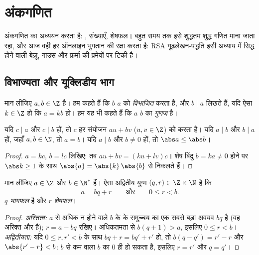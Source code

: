 \chapter{अंकगणित}\label{ch:g12:arith}

अंकगणित  का अध्ययन करता है: ,  संख्याएँ, शेषफल। बहुत
समय तक इसे शुद्धतम शुद्ध गणित माना जाता रहा, और आज वही हर ऑनलाइन भुगतान की
रक्षा करता है: RSA गूढ़लेखन-पद्धति इसी अध्याय में सिद्ध होने वाली बेज़ू, गाउस
और फ़र्मा की प्रमेयों पर टिकी है।

\section{विभाज्यता और यूक्लिडीय भाग}

\begin{definition}[विभाज्यता]\label{def:g12:arith:divides}
मान लीजिए $a, b \in \Z$ है। हम कहते हैं कि $b$ $a$ को \emph{विभाजित}
करता है, और $b \mid a$ लिखते हैं, यदि ऐसा $k \in \Z$ हो कि $a = kb$ हो। हम यह भी कहते हैं कि $a$
$b$ का \emph{गुणज} है।
\end{definition}

\begin{proposition}\label{prop:g12:arith:divprops}
यदि $c \mid a$ और $c \mid b$ हों, तो $c$ हर  संयोजन $au + bv$ ($u, v \in \Z$) को  करता
है। यदि $a \mid b$ और $b \mid a$ हों, जहाँ $a,b \in \N$, तो $a = b$। यदि $a \mid b$ और $b \neq 0$ हों, तो $\abs a \leq \abs b$।
\end{proposition}

\begin{proof}
$a = kc$, $b = lc$ लिखिए: तब $au + bv = (ku + lv)c$। शेष बिंदु $b = ka \neq 0$ होने पर $\abs k \geq 1$ के साथ $\abs{a} = \abs{k}\,\abs{b}$ से निकलते
हैं।
\end{proof}

\begin{theorem}[यूक्लिडीय भाग]\label{thm:g12:arith:euclid}
मान लीजिए $a \in \Z$ और $b \in \N^*$ हैं। ऐसा अद्वितीय युग्म $(q, r) \in \Z \times \N$ है कि
\[
a = bq + r \qquad\text{और}\qquad 0 \leq r < b .
\]
$q$ \emph{भागफल} है और $r$ \emph{शेषफल}।
\end{theorem}

\begin{proof}
\emph{अस्तित्व:} $a$ से अधिक न होने वाले $b$ के  के समुच्चय का एक
सबसे बड़ा अवयव $bq$ है (वह अरिक्त और  है); $r = a - bq$ रखिए। अधिकतमता से
$b(q+1) > a$, इसलिए $0 \leq r < b$।
\emph{अद्वितीयता:} यदि $0 \leq r, r' < b$ के साथ $bq + r = bq' + r'$ हो, तो $b(q - q') = r' - r$ और $\abs{r' - r} < b$: $b$ से कम
 वाला $b$ का  $0$ ही हो सकता है, इसलिए $r = r'$ और $q = q'$।
\end{proof}

